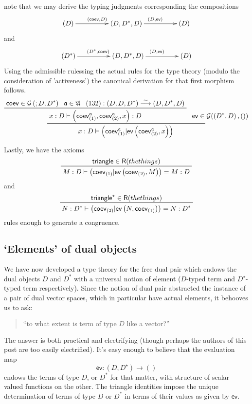 \documentclass[pra,floatfix,
amsmath,superscriptaddress, 12pt]{article}
\theoremstyle{definition}
\newcommand{\liso}{\overset{\sim}{\longrightarrow}}
\newcommand{\evmap}{\mathsf{ev}}
\newcommand{\coev}{\mathsf{coev}}
\newcommand{\msf}[1]{\mathsf{#1}}
\begin{document}
note that we may derive the typing judgments corresponding the compositions
\[
\xymatrixcolsep{4pc}\xymatrix{\left(D\right)\ar[r]^{\left(\coev,D\right)} & \left(D,D^{*},D\right)\ar[r]^{\left(D,\evmap\right)} & \left(D\right)}
\]
and 
\[
\xymatrixcolsep{4pc}\xymatrix{\left(D^{*}\right)\ar[r]^{\left(D^{*},\coev\right)} & \left(D,D^{*},D\right)\ar[r]^{\left(D,\evmap\right)} & \left(D\right)}
\]
Using the admissible rulessing the actual rules for the type theory
(modulo the consideration of 'activeness') the canonical derivation
for that first morphism follows.
\[
\prftree{
    \prftree{
        \coev\in\mathcal{G}\left(;D,D^{*}\right)
    }{
        \mathfrak{a}\in\mathfrak{A}
    }{ 
        \left(132\right):\left(D,D,D^{*}\right)\liso\left(D,D^{*},D\right)
    }{
        x:D\vdash\left(\coev_{\left(1\right)}^{\mathfrak{a}},\coev_{\left(2\right)}^{\mathfrak{a}},x\right):D
    }
    }{
        \evmap \in \mathcal{G}(\left(D^{*},D\right),())
    }{
        x:D\vdash\left(\coev_{\left(1\right)}^{\mathfrak{a}}|\evmap\left(\coev_{\left(2\right)}^{\mathfrak{a}},x\right)\right)
    }
\]

Lastly, we have the axioms 
\[
\prftree{\msf{triangle}\in \msf{R}(the things)}{M:D\vdash\left(\coev_{\left(1\right)}|\evmap\left(\coev_{\left(2\right)},M\right)\right)=M:D}
\]
and 
\[
\prftree{\msf{triangle}^\star\in\msf{R}(the things)}{N:D^{*}\vdash\left(\coev_{\left(2\right)}|\evmap\left(N,\coev_{\left(1\right)}\right)\right)=N:D^{*}}
\]
rules enough to generate a congruence.

\subsection{`Elements' of dual objects}
We have now developed a type theory for the free dual pair which endows
the dual objects $D$ and $D^{*}$ with a universal notion of element ($D$-typed term and $D^\star$-typed term respectively).
Since the notion of dual pair abstracted the instance of a pair of
dual vector spaces, which in particular have actual elements, it behooves
us to ask:
\begin{quotation}
``to what extent is term of type $D$ like a vector?''
\end{quotation}
The answer is both practical and electrifying (though perhaps the
authors of this post are too easily electrified).
%
It's easy enough to believe that the evaluation map 
\[
\evmap:\left(D,D^{\star}\right)\longrightarrow\left(\right)
\]
 endows the terms of type $D$, or $D^{*}$ for that matter, with
structure of scalar valued functions on the other. The triangle identities impose the unique determination of terms of type $D$ or $D^*$ in terms of their values as given by $\evmap$.
\end{document}
